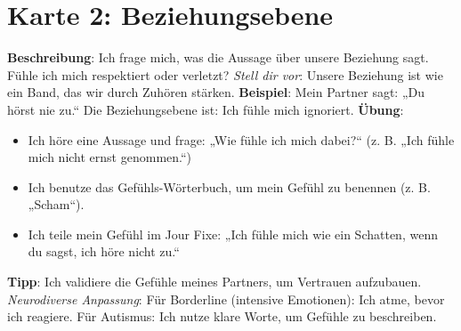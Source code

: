 \documentclass[a4paper,10pt]{article}
\begin{document}
\section*{Karte 2: Beziehungsebene}
\begin{tcolorbox}[colback=calmgrey, colframe=calmblue, title={\textbf{Beziehungsebene: Wie ist unsere Verbindung?}}]
\textbf{Beschreibung}: Ich frage mich, was die Aussage über unsere Beziehung sagt. Fühle ich mich respektiert oder verletzt? \newline
\textit{Stell dir vor}: Unsere Beziehung ist wie ein Band, das wir durch Zuhören stärken. \newline
\textbf{Beispiel}: Mein Partner sagt: „Du hörst nie zu.“ Die Beziehungsebene ist: Ich fühle mich ignoriert. \newline
\textbf{Übung}: 
\begin{itemize}[leftmargin=*]
    \item Ich höre eine Aussage und frage: „Wie fühle ich mich dabei?“ (z. B. „Ich fühle mich nicht ernst genommen.“)
    \item Ich benutze das Gefühls-Wörterbuch, um mein Gefühl zu benennen (z. B. „Scham“).
    \item Ich teile mein Gefühl im Jour Fixe: „Ich fühle mich wie ein Schatten, wenn du sagst, ich höre nicht zu.“
\end{itemize}
\textbf{Tipp}: Ich validiere die Gefühle meines Partners, um Vertrauen aufzubauen. \newline
\textit{Neurodiverse Anpassung}: Für Borderline (intensive Emotionen): Ich atme, bevor ich reagiere. Für Autismus: Ich nutze klare Worte, um Gefühle zu beschreiben.
\end{tcolorbox}
\end{document}
